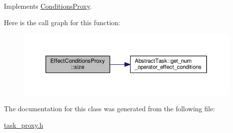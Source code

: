 Implements \hyperlink{classConditionsProxy_af0710776571971659082f0140e4cdba3}{Conditions\-Proxy}.



Here is the call graph for this function\-:
\nopagebreak
\begin{figure}[H]
\begin{center}
\leavevmode
\includegraphics[width=350pt]{classEffectConditionsProxy_af447849d62079e622be08a68df7dab14_cgraph}
\end{center}
\end{figure}




The documentation for this class was generated from the following file\-:\begin{DoxyCompactItemize}
\item 
\hyperlink{task__proxy_8h}{task\-\_\-proxy.\-h}\end{DoxyCompactItemize}
